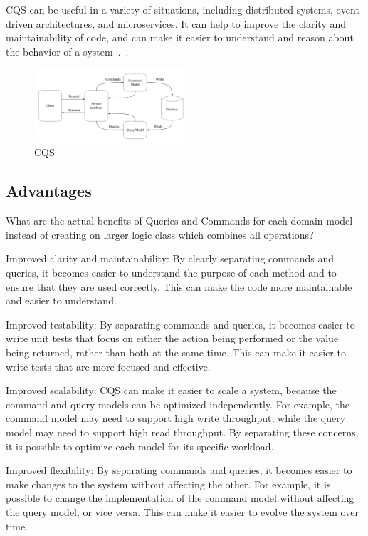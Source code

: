 \documentclass[11pt,conference]{IEEEtran}
\begin{document}
CQS can be useful in a variety of situations, including distributed systems, event-driven architectures, and microservices. It can help to improve the clarity and maintainability of code, and can make it easier to understand and reason about the behavior of a system~\cite{martinfowler-cqs}.~\cite{martinfowler-cqs}.

\begin{figure}[h]
    \centering
    \includegraphics[width=0.5\textwidth]{images/CQS.png}
    \caption{CQS~\cite[14]{cqrs-in-practise}}
    \label{fig:cqs}
\end{figure}

\subsection{Advantages}

What are the actual benefits of Queries and Commands for each domain model instead of creating on larger logic class which combines all operations?~\cite{martinfowler-cqs}

Improved clarity and maintainability: By clearly separating commands and queries, it becomes easier to understand the purpose of each method and to ensure that they are used correctly. This can make the code more maintainable and easier to understand.

Improved testability: By separating commands and queries, it becomes easier to write unit tests that focus on either the action being performed or the value being returned, rather than both at the same time. This can make it easier to write tests that are more focused and effective.

Improved scalability: CQS can make it easier to scale a system, because the command and query models can be optimized independently. For example, the command model may need to support high write throughput, while the query model may need to support high read throughput. By separating these concerns, it is possible to optimize each model for its specific workload.

Improved flexibility: By separating commands and queries, it becomes easier to make changes to the system without affecting the other. For example, it is possible to change the implementation of the command model without affecting the query model, or vice versa. This can make it easier to evolve the system over time.
\end{document}
